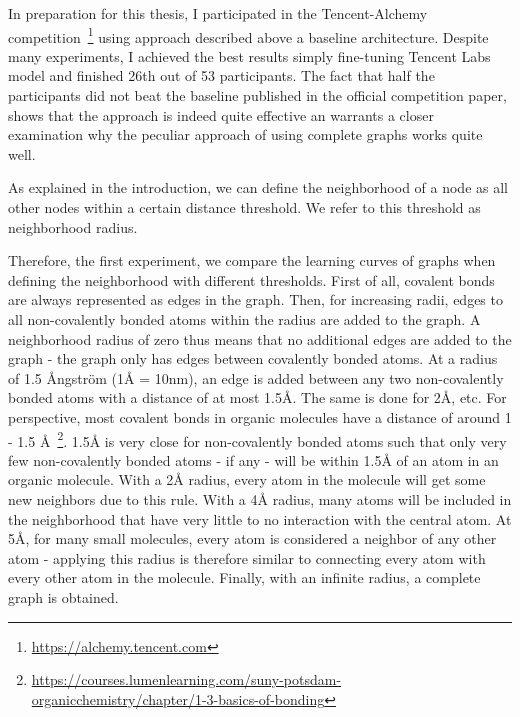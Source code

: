 In preparation for this thesis, I participated in the Tencent-Alchemy competition~\footnote{\url{https://alchemy.tencent.com}} using approach described above a baseline architecture. Despite many experiments, I achieved the best results simply fine-tuning Tencent Labs model and finished 26th out of 53 participants. The fact that half the participants did not beat the baseline published in the official competition paper, shows that the approach is indeed quite effective an warrants a closer examination why the peculiar approach of using complete graphs works quite well.



As explained in the introduction, we can define the neighborhood of a node as all other nodes within a certain distance threshold. We refer to this threshold as neighborhood radius.

Therefore, the first experiment, we compare the learning curves of graphs when defining the neighborhood with different thresholds. First of all, covalent bonds are always represented as edges in the graph. Then, for increasing radii, edges to all non-covalently bonded atoms within the radius are added to the graph. A neighborhood radius of zero thus means that no additional edges are added to the graph - the graph only has edges between covalently bonded atoms. At a radius of 1.5 Ångström (1Å = 10nm), an edge is added between any two non-covalently bonded atoms with a distance of at most 1.5Å. The same is done for 2Å, etc. For perspective, most covalent bonds in organic molecules have a distance of around 1 - 1.5 Å~\footnote{\url{https://courses.lumenlearning.com/suny-potsdam-organicchemistry/chapter/1-3-basics-of-bonding}}. 1.5Å is very close for non-covalently bonded atoms such that only very few non-covalently bonded atoms - if any - will be within 1.5Å of an atom in an organic molecule. With a 2Å radius, every atom in the molecule will get some new neighbors due to this rule. With a 4Å radius, many atoms will be included in the neighborhood that have very little to no interaction with the central atom. At 5Å, for many small molecules, every atom is considered a neighbor of any other atom - applying this radius is therefore similar to connecting every atom with every other atom in the molecule. Finally, with an infinite radius, a complete graph is obtained.


